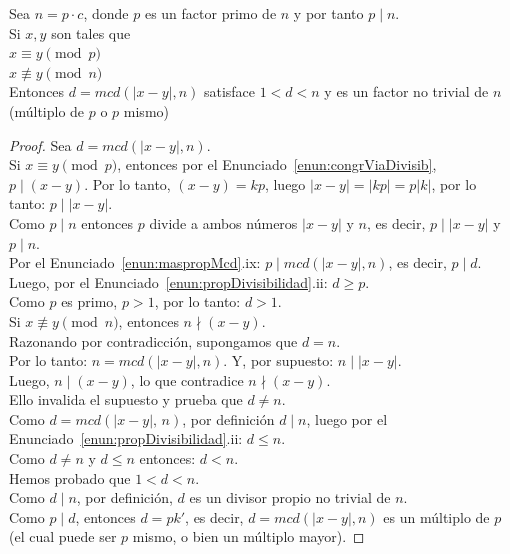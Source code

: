 \begin{enunciado} \label{enun:extraeFactor}\leavevmode\par 
Sea $n=p \cdot c$, donde $p$ es un factor primo de $n$ y por tanto $p \mid n$. \\ 
Si $x,y$ son tales que \\ 
$x \equiv y \pmod p$ \\ 
$x \not\equiv y \pmod n $ \\ 
Entonces $d = mcd(|x - y|,n)$ satisface $1 < d < n$ y es un factor no trivial de $n$ (múltiplo de $p$ o $p$ mismo)
\end{enunciado}

\begin{proof} Sea $d = mcd(|x - y|,n)$. \\
Si $x \equiv y \pmod p$, entonces por el Enunciado~\ref{enun:congrViaDivisib}, $p \mid (x - y)$. Por lo tanto, $(x-y)=kp$, luego $|x-y|=|kp|=p|k|$, por lo tanto: $p \mid |x-y|$. \\
Como $p \mid n$ entonces $p$ divide a ambos números $|x - y|$ y $n$, es decir, $p \mid |x-y|$ y $p \mid n$. \\
Por el Enunciado~\ref{enun:maspropMcd}.ix: $p \mid mcd(|x - y|,n)$, es decir, $p \mid d$. Luego, por el Enunciado~\ref{enun:propDivisibilidad}.ii: $d \geq p$. \\
Como $p$ es primo, $p > 1$, por lo tanto: $d > 1$. \\
Si $x \nequiv y \pmod n $, entonces $n \nmid (x - y)$. \\
Razonando por contradicción, supongamos que $d = n$. \\
Por lo tanto: $n = mcd(|x - y|,n)$. Y, por supuesto: $n \mid |x - y|$. \\
Luego, $n \mid (x - y)$, lo que contradice $n \nmid (x - y)$. \\
Ello invalida el supuesto y prueba que $d \neq n$. \\
Como $d = mcd(|x - y|,\, n)$, por definición $d \mid n$, luego  por el Enunciado~\ref{enun:propDivisibilidad}.ii: $d \leq n$. \\ 
Como $d \neq n$ y $d \leq n$ entonces: $d < n$. \\
Hemos probado que $1 < d < n$. \\
Como $d \mid n$, por definición, $d$ es un divisor propio no trivial de $n$. \\
Como $p \mid d$, entonces $d=pk'$, es decir, $d= mcd(|x - y|,n)$ es un múltiplo de $p$ (el cual puede ser $p$ mismo, o bien un múltiplo mayor).
\end{proof}

